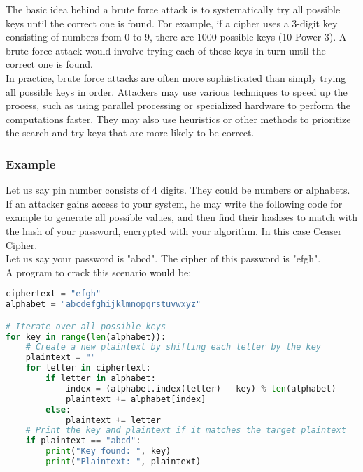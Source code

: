 \documentclass[11pt]{article}
\begin{document}
The basic idea behind a brute force attack is to systematically try all possible keys until the correct one is found. For example, if a cipher uses a 3-digit key consisting of numbers from 0 to 9, there are 1000 possible keys (10 Power 3). A brute force attack would involve trying each of these keys in turn until the correct one is found.\\

In practice, brute force attacks are often more sophisticated than simply trying all possible keys in order. Attackers may use various techniques to speed up the process, such as using parallel processing or specialized hardware to perform the computations faster. They may also use heuristics or other methods to prioritize the search and try keys that are more likely to be correct.


\subsubsection{Example}

Let us say pin number consists of 4 digits. They could be numbers or alphabets. If an attacker gains access to your system, he may write the following code for example to generate all possible values, and then find their hashses to match with the hash of your password, encrypted with your algorithm. In this case Ceaser Cipher.\\

Let us say your password is "abcd". The cipher of this password is "efgh".\\

A program to crack this scenario would be:

\begin{lstlisting}[language=python]
ciphertext = "efgh"
alphabet = "abcdefghijklmnopqrstuvwxyz"

# Iterate over all possible keys
for key in range(len(alphabet)):
    # Create a new plaintext by shifting each letter by the key
    plaintext = ""
    for letter in ciphertext:
        if letter in alphabet:
            index = (alphabet.index(letter) - key) % len(alphabet)
            plaintext += alphabet[index]
        else:
            plaintext += letter
    # Print the key and plaintext if it matches the target plaintext
    if plaintext == "abcd":
        print("Key found: ", key)
        print("Plaintext: ", plaintext)

\end{lstlisting}
\end{document}
